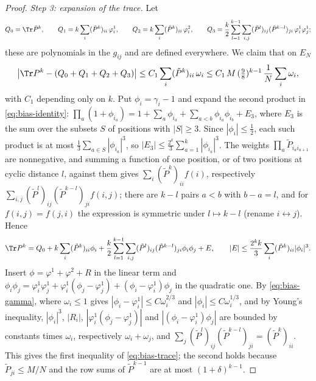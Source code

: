 \begin{proof}
\emph{Step 3: expansion of the trace.} Let
\[
Q_0=\Tr\tilde P^k,\qquad Q_1=k\sum_i(\tilde P^k)_{ii}\,\varphi^1_i,\qquad Q_2=k\sum_i(\tilde P^k)_{ii}\,\varphi^2_i,\qquad Q_3=\frac k2\sum_{l=1}^{k-1}\sum_{i,j}(\tilde P^l)_{ij}(\tilde P^{k-l})_{ji}\,\varphi^1_i\varphi^1_j ;
\]
these are polynomials in the $g_{ij}$ and are defined everywhere. We claim that on $E_N$
\begin{equation}\label{eq:bias-trace}
\big|\Tr P^k-(Q_0+Q_1+Q_2+Q_3)\big|\le C_1\sum_i(\tilde P^k)_{ii}\,\omega_i\le C_1\,M\,(\tfrac98)^{k-1}\,\frac1N\sum_i\omega_i ,
\end{equation}
with $C_1$ depending only on $k$. Put $\phi_i=\gamma_i-1$ and expand the second product in \eqref{eq:bias-identity}: $\prod_a(1+\phi_{i_a})=1+\sum_a\phi_{i_a}+\sum_{a<b}\phi_{i_a}\phi_{i_b}+E_3$, where $E_3$ is the sum over the subsets $S$ of positions with $|S|\ge3$. Since $|\phi_i|\le\frac12$, each such product is at most $\frac13\sum_{a\in S}|\phi_{i_a}|^3$, so $|E_3|\le\frac{2^k}{3}\sum_{a=1}^k|\phi_{i_a}|^3$. The weights $\prod_a\tilde P_{i_ai_{a+1}}$ are nonnegative, and summing a function of one position, or of two positions at cyclic distance $l$, against them gives $\sum_i(\tilde P^k)_{ii}f(i)$, respectively $\sum_{i,j}(\tilde P^l)_{ij}(\tilde P^{k-l})_{ji}f(i,j)$; there are $k-l$ pairs $a<b$ with $b-a=l$, and for $f(i,j)=f(j,i)$ the expression is symmetric under $l\mapsto k-l$ (rename $i\leftrightarrow j$). Hence
\[
\Tr P^k=Q_0+k\sum_i(\tilde P^k)_{ii}\phi_i+\frac k2\sum_{l=1}^{k-1}\sum_{i,j}(\tilde P^l)_{ij}(\tilde P^{k-l})_{ji}\phi_i\phi_j+E,\qquad|E|\le\frac{2^kk}{3}\sum_i(\tilde P^k)_{ii}|\phi_i|^3 .
\]
Insert $\phi=\varphi^1+\varphi^2+R$ in the linear term and $\phi_i\phi_j=\varphi^1_i\varphi^1_j+\varphi^1_i(\phi_j-\varphi^1_j)+(\phi_i-\varphi^1_i)\phi_j$ in the quadratic one. By \eqref{eq:bias-gamma}, where $\omega_i\le1$ gives $|\phi_i-\varphi^1_i|\le C\omega_i^{2/3}$ and $|\phi_i|\le C\omega_i^{1/3}$, and by Young's inequality, $|\phi_i|^3$, $|R_i|$, $|\varphi^1_i(\phi_j-\varphi^1_j)|$ and $|(\phi_i-\varphi^1_i)\phi_j|$ are bounded by constants times $\omega_i$, respectively $\omega_i+\omega_j$, and $\sum_j(\tilde P^l)_{ij}(\tilde P^{k-l})_{ji}=(\tilde P^k)_{ii}$. This gives the first inequality of \eqref{eq:bias-trace}; the second holds because $\tilde P_{ji}\le M/N$ and the row sums of $\tilde P^{k-1}$ are at most $(1+\delta)^{k-1}$.


\end{proof}

